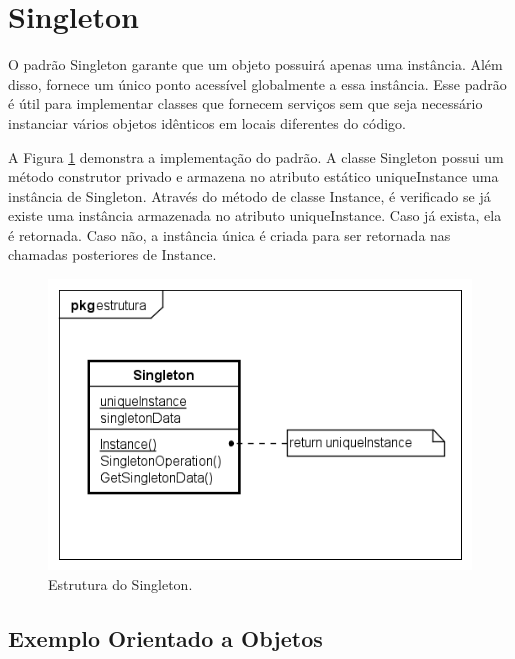 \section{Singleton}

O padrão Singleton garante que um objeto possuirá apenas uma 
instância. Além disso, fornece um único ponto acessível 
globalmente a essa instância. Esse padrão é útil 
para implementar classes que fornecem serviços sem que seja 
necessário instanciar vários objetos idênticos em 
locais diferentes do código.\cite{gamma:1995}

A Figura \ref{singleton_struct} demonstra a implementação 
do padrão. A classe Singleton possui um método construtor 
privado e armazena no atributo estático uniqueInstance uma 
instância de Singleton. Através do método de classe 
Instance, é verificado se já existe uma instância 
armazenada no atributo uniqueInstance. Caso já exista, 
ela é retornada. Caso não, a instância única é criada 
para ser retornada nas chamadas posteriores de Instance.

\begin{figure}[htb]
	\caption{\label{singleton_struct}Estrutura do Singleton.}
	\begin{center}
	    \includegraphics[scale=0.6]{5_padroes-contexto-funcional/5.1_criacionais/5.1.5_singleton/singleton_estrutura.png}
	\end{center}
\end{figure}

\subsection*{Exemplo Orientado a Objetos}

